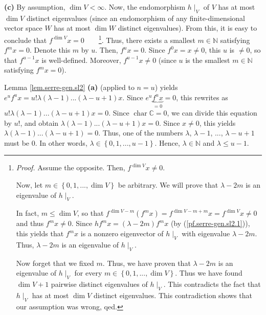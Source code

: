 \documentclass[etingof-lie.tex]{subfiles}
\begin{document}
\textbf{(c)} By assumption, $\dim V<\infty$. Now, the endomorphism $h\mid_{V}$
of $V$ has at most $\dim V$ distinct eigenvalues (since an endomorphism of any
finite-dimensional vector space $W$ has at most $\dim W$ distinct
eigenvalues). From this, it is easy to conclude that $f^{\dim V}%
x=0$\ \ \ \ \footnote{\textit{Proof.} Assume the opposite. Then, $f^{\dim
V}x\neq0$.
\par
Now, let $m\in\left\{  0,1,...,\dim V\right\}  $ be arbitrary. We will prove
that $\lambda-2m$ is an eigenvalue of $h\mid_{V}$.
\par
In fact, $m\leq\dim V$, so that $f^{\dim V-m}\left(  f^{m}x\right)  =f^{\dim
V-m+m}x=f^{\dim V}x\neq0$ and thus $f^{m}x\neq0$. Since $hf^{m}x=\left(
\lambda-2m\right)  f^{m}x$ (by (\ref{pf.serre-gen.sl2.1})), this yields that
$f^{m}x$ is a nonzero eigenvector of $h\mid_{V}$ with eigenvalue $\lambda-2m$.
Thus, $\lambda-2m$ is an eigenvalue of $h\mid_{V}$.
\par
Now forget that we fixed $m$. Thus, we have proven that $\lambda-2m$ is an
eigenvalue of $h\mid_{V}$ for every $m\in\left\{  0,1,...,\dim V\right\}  $.
Thus we have found $\dim V+1$ pairwise distinct eigenvalues of $h\mid_{V}$.
This contradicts the fact that $h\mid_{V}$ has at most $\dim V$ distinct
eigenvalues. This contradiction shows that our assumption was wrong, qed.}.
Thus, there exists a smallest $m\in\mathbb{N}$ satisfying $f^{m}x=0$. Denote
this $m$ by $u$. Then, $f^{u}x=0$. Since $f^{0}x=x\neq0$, this $u$ is $\neq0$,
so that $f^{u-1}x$ is well-defined. Moreover, $f^{u-1}x\neq0$ (since $u$ is
the smallest $m\in\mathbb{N}$ satisfying $f^{m}x=0$).

Lemma \ref{lem.serre-gen.sl2} \textbf{(a)} (applied to $n=u$) yields
$e^{u}f^{u}x=u!\lambda\left(  \lambda-1\right)  ...\left(  \lambda-u+1\right)
x$. Since $e^{u}\underbrace{f^{u}x}_{=0}=0$, this rewrites as $u!\lambda
\left(  \lambda-1\right)  ...\left(  \lambda-u+1\right)  x=0$. Since
$\operatorname*{char}\mathbb{C}=0$, we can divide this equation by $u!$, and
obtain $\lambda\left(  \lambda-1\right)  ...\left(  \lambda-u+1\right)  x=0$.
Since $x\neq0$, this yields $\lambda\left(  \lambda-1\right)  ...\left(
\lambda-u+1\right)  =0$. Thus, one of the numbers $\lambda$, $\lambda-1$,
$...$, $\lambda-u+1$ must be $0$. In other words, $\lambda\in\left\{
0,1,...,u-1\right\}  $. Hence, $\lambda\in\mathbb{N}$ and $\lambda\leq u-1$.
\end{document}

